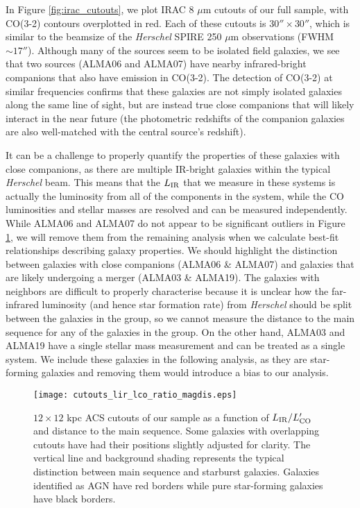 \documentclass[a4paper,fleqn,usenatbib]{mnras}
\newcommand{\lir}{L_{\rm{IR}}}
\newcommand{\lco}{L'_{\rm{CO}}}
\begin{document}
In Figure \ref{fig:irac_cutouts}, we plot IRAC 8 $\mu$m cutouts of our full sample, with CO(3-2) contours overplotted in red. Each of these cutouts is $30'' \times 30''$, which is similar to the beamsize of the {\em Herschel} SPIRE 250 $\mu$m observations (FWHM $\sim 17''$). Although many of the sources seem to be isolated field galaxies, we see that two sources (ALMA06 and ALMA07) have nearby infrared-bright companions that also have emission in CO(3-2). The detection of CO(3-2) at similar frequencies confirms that these galaxies are not simply isolated galaxies along the same line of sight, but are instead true close companions that will likely interact in the near future (the photometric redshifts of the companion galaxies are also well-matched with the central source's redshift). 

It can be a challenge to properly quantify the properties of these galaxies with close companions, as there are multiple IR-bright galaxies within the typical {\em Herschel} beam. This means that the $\lir$ that we measure in these systems is actually the luminosity from all of the components in the system, while the CO luminosities and stellar masses are resolved and can be measured independently. While ALMA06 and ALMA07 do not appear to be significant outliers in Figure \ref{fig:cutouts}, we will remove them from the remaining analysis when we calculate best-fit relationships describing galaxy properties. We should highlight the distinction between galaxies with close companions (ALMA06 \& ALMA07) and galaxies that are likely undergoing a merger (ALMA03 \& ALMA19).  The galaxies with neighbors are difficult to properly characterise because it is unclear how the far-infrared luminosity (and hence star formation rate) from {\em Herschel} should be split between the galaxies in the group, so we cannot measure the distance to the main sequence for any of the galaxies in the group.  On the other hand, ALMA03 and ALMA19 have a single stellar mass measurement and can be treated as a single system.  We include these galaxies in the following analysis, as they are star-forming galaxies and removing them would introduce a bias to our analysis. 

\begin{figure*}
\centering
\texttt{[image: cutouts\_lir\_lco\_ratio\_magdis.eps]}
\caption{$12 \times 12$ kpc ACS cutouts of our sample as a function of $\lir / \lco$ and distance to the main sequence. Some galaxies with overlapping cutouts have had their positions slightly adjusted for clarity. The vertical line and background shading represents the typical distinction between main sequence and starburst galaxies.  Galaxies identified as AGN have red borders while pure star-forming galaxies have black borders.}
\label{fig:cutouts}
\end{figure*}
\end{document}
